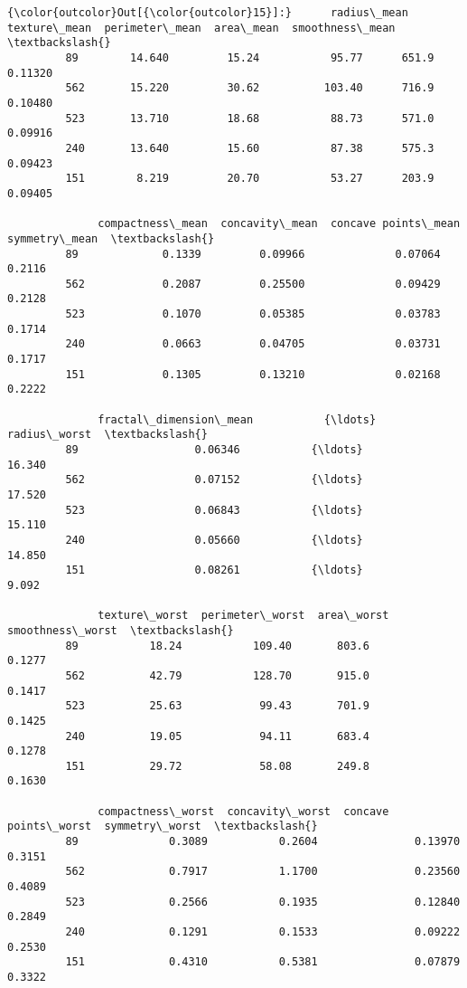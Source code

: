 \documentclass[11pt]{article}
\begin{document}
\begin{Verbatim}[commandchars=\\\{\}]
{\color{outcolor}Out[{\color{outcolor}15}]:}      radius\_mean  texture\_mean  perimeter\_mean  area\_mean  smoothness\_mean  \textbackslash{}
         89        14.640         15.24           95.77      651.9          0.11320   
         562       15.220         30.62          103.40      716.9          0.10480   
         523       13.710         18.68           88.73      571.0          0.09916   
         240       13.640         15.60           87.38      575.3          0.09423   
         151        8.219         20.70           53.27      203.9          0.09405   
         
              compactness\_mean  concavity\_mean  concave points\_mean  symmetry\_mean  \textbackslash{}
         89             0.1339         0.09966              0.07064         0.2116   
         562            0.2087         0.25500              0.09429         0.2128   
         523            0.1070         0.05385              0.03783         0.1714   
         240            0.0663         0.04705              0.03731         0.1717   
         151            0.1305         0.13210              0.02168         0.2222   
         
              fractal\_dimension\_mean           {\ldots}             radius\_worst  \textbackslash{}
         89                  0.06346           {\ldots}                   16.340   
         562                 0.07152           {\ldots}                   17.520   
         523                 0.06843           {\ldots}                   15.110   
         240                 0.05660           {\ldots}                   14.850   
         151                 0.08261           {\ldots}                    9.092   
         
              texture\_worst  perimeter\_worst  area\_worst  smoothness\_worst  \textbackslash{}
         89           18.24           109.40       803.6            0.1277   
         562          42.79           128.70       915.0            0.1417   
         523          25.63            99.43       701.9            0.1425   
         240          19.05            94.11       683.4            0.1278   
         151          29.72            58.08       249.8            0.1630   
         
              compactness\_worst  concavity\_worst  concave points\_worst  symmetry\_worst  \textbackslash{}
         89              0.3089           0.2604               0.13970          0.3151   
         562             0.7917           1.1700               0.23560          0.4089   
         523             0.2566           0.1935               0.12840          0.2849   
         240             0.1291           0.1533               0.09222          0.2530   
         151             0.4310           0.5381               0.07879          0.3322   
         

\end{Verbatim}
\end{document}
